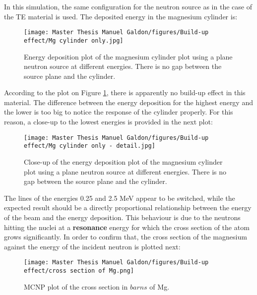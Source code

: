 In this simulation, the same configuration for the neutron source as in the case of the TE material is used. The deposited energy in the  magnesium cylinder is:

\begin{figure}[!h]
\centering
\begin{minipage}{0.8\textwidth}
    \centering
    \texttt{[image: Master Thesis Manuel Galdon/figures/Build-up effect/Mg cylinder only.jpg]}
    \label{fig:IC}
\end{minipage}
    \caption{Energy deposition plot of the magnesium cylinder plot using a plane neutron source at different energies. There is no gap between the source plane and the cylinder.}
    \label{fig:Mg cylinder with plane neutron source}
\end{figure}

According to the plot on Figure \ref{fig:Mg cylinder with plane neutron source}, there is apparently no build-up effect in this material. The difference between the energy deposition for the highest energy and the lower is too big to notice the response of the cylinder properly. For this reason, a close-up to the lowest energies is provided in the next plot: 
\newpage
\begin{figure}[!h]
\centering
\begin{minipage}{0.8\textwidth}
    \centering
    \texttt{[image: Master Thesis Manuel Galdon/figures/Build-up effect/Mg cylinder only - detail.jpg]}
\end{minipage}
    \caption{Close-up of the energy deposition plot of the magnesium cylinder plot using a plane neutron source at different energies. There is no gap between the source plane and the cylinder.}
    \label{fig:Mg cylinder in detail with plane neutron source}
\end{figure}

The lines of the energies 0.25 and 2.5 \unit{\mega\electronvolt} appear to be switched, while the expected result should be a directly proportional relationship between the energy of the beam and the energy deposition.
This behaviour is due to the neutrons hitting the nuclei at a \textbf{resonance} energy for which the cross section of the atom grows significantly. In order to confirm that, the cross section of the magnesium against the energy of the incident neutron is plotted next:
\newpage
\begin{figure}[!h]
\centering
\begin{minipage}[t]{0.8\textwidth}
    \centering
    \texttt{[image: Master Thesis Manuel Galdon/figures/Build-up effect/cross section of Mg.png]} 
    \caption{MCNP plot of the cross section in $barns$ of Mg.}
    \label{fig:Cross section of Mg}
\end{minipage}
\end{figure}

